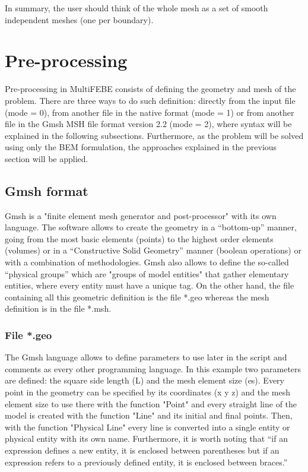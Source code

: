 \documentclass[A4]{article}
\begin{document}
In summary, the user should think of the whole mesh as a set of smooth independent meshes (one per boundary).

\section{Pre-processing} 

Pre-processing in MultiFEBE consists of defining the geometry and mesh of the problem. There are three ways to do such definition: directly from the input file (mode = 0), from another file in the native format (mode = 1) or from another file in the Gmsh MSH file format version 2.2 (mode = 2), where syntax will be explained in the following subsections. Furthermore, as the problem will be solved using only the BEM formulation, the approaches explained in the previous section will be applied.      

\subsection{Gmsh format}

Gmsh \cite{gmsh, gmshweb} is a "finite element mesh generator and post-processor" with its own language. The software allows to create the geometry in a “bottom-up” manner, going from the most basic elements (points) to the highest order elements (volumes) or in a “Constructive Solid Geometry” manner (boolean operations) or with a combination of methodologies. Gmsh also allows to define  the so-called “physical groups” which are "groups of model entities" that gather elementary entities, where every entity must have a unique tag. On the other hand, the file containing all this geometric definition is the file *.geo whereas the mesh definition is in the file *.msh. 

\subsubsection{File *.geo}

The Gmsh language allows to define parameters to use later in the script and comments as every other programming language. In this example two parameters are defined: the square side length (L) and the mesh element size (es). Every point in the geometry can be specified by its coordinates (x y z) and the mesh element size to use there with the function "Point" and every straight line of the model is created with the function "Line" and its initial and final points. Then, with the function "Physical Line" every line is converted into a single entity or physical entity with its own name. Furthermore, it is worth noting that “if an expression defines a new entity, it is enclosed between parentheses but if an expression refers to a previously defined entity, it is enclosed between braces.” \cite{gmshweb} 
\end{document}
